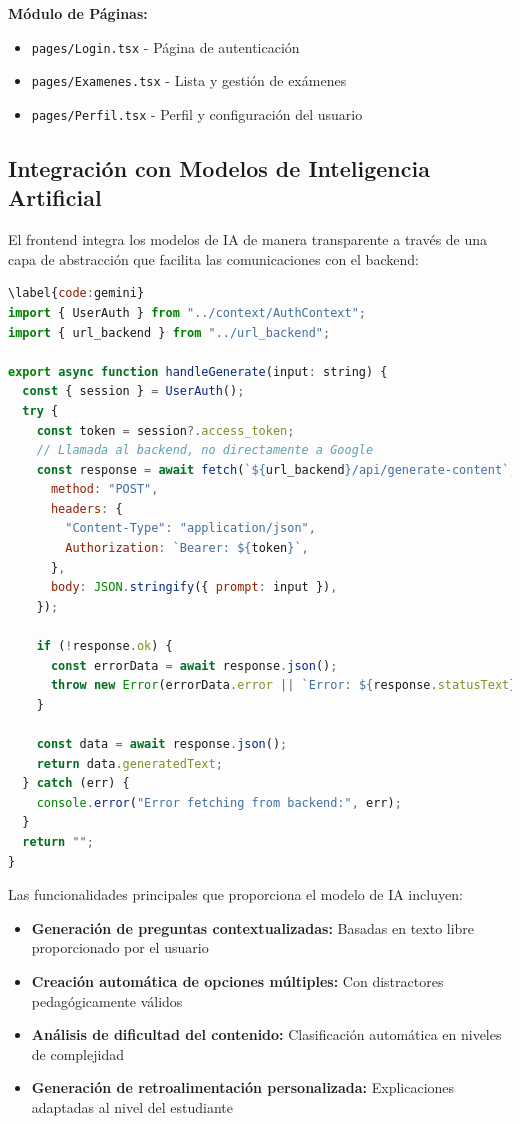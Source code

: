 \documentclass[12pt,a4paper]{report}
\begin{document}
\textbf{Módulo de Páginas:}
\begin{itemize}
\item \texttt{pages/Login.tsx} - Página de autenticación
\item \texttt{pages/Examenes.tsx} - Lista y gestión de exámenes
\item \texttt{pages/Perfil.tsx} - Perfil y configuración del usuario
\end{itemize}

\subsection{Integración con Modelos de Inteligencia Artificial}

El frontend integra los modelos de IA de manera transparente a través de una capa de abstracción que facilita las comunicaciones con el backend:

\begin{lstlisting}[language=JavaScript, caption={Código \ref{code:gemini}: Integración con Gemini AI}]
\label{code:gemini}
import { UserAuth } from "../context/AuthContext";
import { url_backend } from "../url_backend";

export async function handleGenerate(input: string) {
  const { session } = UserAuth();
  try {
    const token = session?.access_token;
    // Llamada al backend, no directamente a Google
    const response = await fetch(`${url_backend}/api/generate-content`, {
      method: "POST",
      headers: {
        "Content-Type": "application/json",
        Authorization: `Bearer: ${token}`,
      },
      body: JSON.stringify({ prompt: input }),
    });

    if (!response.ok) {
      const errorData = await response.json();
      throw new Error(errorData.error || `Error: ${response.statusText}`);
    }

    const data = await response.json();
    return data.generatedText;
  } catch (err) {
    console.error("Error fetching from backend:", err);
  }
  return "";
}
\end{lstlisting}

Las funcionalidades principales que proporciona el modelo de IA incluyen:

\begin{itemize}
\item \textbf{Generación de preguntas contextualizadas:} Basadas en texto libre proporcionado por el usuario
\item \textbf{Creación automática de opciones múltiples:} Con distractores pedagógicamente válidos
\item \textbf{Análisis de dificultad del contenido:} Clasificación automática en niveles de complejidad
\item \textbf{Generación de retroalimentación personalizada:} Explicaciones adaptadas al nivel del estudiante
\end{itemize}
\end{document}

